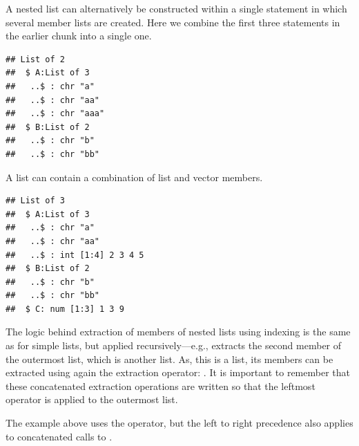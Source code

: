 \documentclass[krantz2]{krantz}\usepackage{knitr}
\begin{document}
A nested list can alternatively be constructed within a single statement in which several member lists are created. Here we combine the first three statements in the earlier chunk into a single one.

\begin{knitrout}\footnotesize
{}\color{fgcolor}\begin{kframe}
\begin{alltt}
 \hlkwb{<-} \hlstd{(} \hlstd{=} \hlstd{(}\hlstd{,} \hlstd{,} \hlstd{),}  \hlstd{=} \hlstd{(}\hlstd{,} \hlstd{))}
\end{alltt}
\begin{verbatim}
## List of 2
##  $ A:List of 3
##   ..$ : chr "a"
##   ..$ : chr "aa"
##   ..$ : chr "aaa"
##  $ B:List of 2
##   ..$ : chr "b"
##   ..$ : chr "bb"
\end{verbatim}
\end{kframe}
\end{knitrout}

A list can contain a combination of list and vector members.

\begin{knitrout}\footnotesize
{}\color{fgcolor}\begin{kframe}
\begin{alltt}
 \hlkwb{<-} \hlstd{(} \hlstd{=} \hlstd{(}\hlstd{,} \hlstd{,} \hlstd{(}\hlopt{:}\hlstd{)),}
                     \hlstd{=} \hlstd{(}\hlstd{,} \hlstd{),}
                     \hlstd{=} \hlstd{(}\hlstd{,} \hlstd{,} \hlstd{))}
\end{alltt}
\begin{verbatim}
## List of 3
##  $ A:List of 3
##   ..$ : chr "a"
##   ..$ : chr "aa"
##   ..$ : int [1:4] 2 3 4 5
##  $ B:List of 2
##   ..$ : chr "b"
##   ..$ : chr "bb"
##  $ C: num [1:3] 1 3 9
\end{verbatim}
\end{kframe}
\end{knitrout}

\begin{explainbox}
The logic behind extraction of members of nested lists using indexing is the same as for simple lists, but applied recursively---e.g.,  extracts the second member of the outermost list, which is another list. As, this is a list, its members can be extracted using again the extraction operator: . It is important to remember that these concatenated extraction operations are written so that the leftmost operator is applied to the outermost list.

The example above uses the \Roperator{[[ ]]} operator, but the left to right precedence also applies to concatenated calls to \Roperator{[ ]}.
\end{explainbox}
\end{document}
